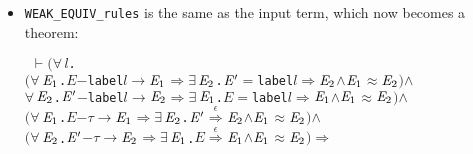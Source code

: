 \documentclass[GCNS]{yincog}
\renewcommand{\HOLConst}[1]{\texttt{#1}}
\renewcommand{\HOLBoundVar}[1]{\ensuremath{\mathit{#1}}}
\renewcommand{\HOLFreeVar}[1]{\ensuremath{\mathit{#1}}}
\renewcommand{\HOLSymConst}[1]{#1}
\renewcommand{\HOLTokenConj}{\ensuremath{\wedge}}
\renewcommand{\HOLTokenExists}{\ensuremath{\exists \,}}
\renewcommand{\HOLTokenForall}{\ensuremath{\forall \,}}
\renewcommand{\HOLTokenTurnstile}{\ensuremath{\:\:\vdash}}
\theoremstyle{remark}
\theoremstyle{theorem}
\theoremstyle{remark}
\newcommand{\HOLTokenWeakEQ}{$\approx$}
\newcommand{\HOLTokenEPS}{$\overset{\epsilon}{\Longrightarrow}$}
\newcommand{\HOLTokenTransBegin}{$-$}
\newcommand{\HOLTokenTransEnd}{$\rightarrow$\xspace}
\newcommand{\HOLTokenWeakTransBegin}{$=$}
\newcommand{\HOLTokenWeakTransEnd}{$\Rightarrow$\xspace}
\renewcommand{\HOLTokenImp}{\ensuremath{\Longrightarrow}}
\begin{document}
\begin{itemize}
%
\item \texttt{WEAK\_EQUIV\_rules} is the same as the input term, which now
becomes a theorem:
%
\begin{alltt}
\HOLTokenTurnstile{} \ensuremath{(}\HOLSymConst{\HOLTokenForall{}}\HOLBoundVar{l}.
        \ensuremath{(}\HOLSymConst{\HOLTokenForall{}}\ensuremath{\HOLBoundVar{E}\sb{\mathrm{1}}}. \HOLFreeVar{E} \HOLTokenTransBegin\HOLConst{label} \HOLBoundVar{l}\HOLTokenTransEnd \ensuremath{\HOLBoundVar{E}\sb{\mathrm{1}}} \HOLSymConst{\HOLTokenImp{}} \HOLSymConst{\HOLTokenExists{}}\ensuremath{\HOLBoundVar{E}\sb{\mathrm{2}}}. \ensuremath{\HOLFreeVar{E}\sp{\prime}} \HOLTokenWeakTransBegin\HOLConst{label} \HOLBoundVar{l}\HOLTokenWeakTransEnd \ensuremath{\HOLBoundVar{E}\sb{\mathrm{2}}} \HOLSymConst{\HOLTokenConj{}} \ensuremath{\HOLBoundVar{E}\sb{\mathrm{1}}} \HOLSymConst{\HOLTokenWeakEQ} \ensuremath{\HOLBoundVar{E}\sb{\mathrm{2}}}\ensuremath{)} \HOLSymConst{\HOLTokenConj{}}
        \HOLSymConst{\HOLTokenForall{}}\ensuremath{\HOLBoundVar{E}\sb{\mathrm{2}}}. \ensuremath{\HOLFreeVar{E}\sp{\prime}} \HOLTokenTransBegin\HOLConst{label} \HOLBoundVar{l}\HOLTokenTransEnd \ensuremath{\HOLBoundVar{E}\sb{\mathrm{2}}} \HOLSymConst{\HOLTokenImp{}} \HOLSymConst{\HOLTokenExists{}}\ensuremath{\HOLBoundVar{E}\sb{\mathrm{1}}}. \HOLFreeVar{E} \HOLTokenWeakTransBegin\HOLConst{label} \HOLBoundVar{l}\HOLTokenWeakTransEnd \ensuremath{\HOLBoundVar{E}\sb{\mathrm{1}}} \HOLSymConst{\HOLTokenConj{}} \ensuremath{\HOLBoundVar{E}\sb{\mathrm{1}}} \HOLSymConst{\HOLTokenWeakEQ} \ensuremath{\HOLBoundVar{E}\sb{\mathrm{2}}}\ensuremath{)} \HOLSymConst{\HOLTokenConj{}}
   \ensuremath{(}\HOLSymConst{\HOLTokenForall{}}\ensuremath{\HOLBoundVar{E}\sb{\mathrm{1}}}. \HOLFreeVar{E} \HOLTokenTransBegin\HOLSymConst{\ensuremath{\tau}}\HOLTokenTransEnd \ensuremath{\HOLBoundVar{E}\sb{\mathrm{1}}} \HOLSymConst{\HOLTokenImp{}} \HOLSymConst{\HOLTokenExists{}}\ensuremath{\HOLBoundVar{E}\sb{\mathrm{2}}}. \ensuremath{\HOLFreeVar{E}\sp{\prime}} \HOLSymConst{\HOLTokenEPS} \ensuremath{\HOLBoundVar{E}\sb{\mathrm{2}}} \HOLSymConst{\HOLTokenConj{}} \ensuremath{\HOLBoundVar{E}\sb{\mathrm{1}}} \HOLSymConst{\HOLTokenWeakEQ} \ensuremath{\HOLBoundVar{E}\sb{\mathrm{2}}}\ensuremath{)} \HOLSymConst{\HOLTokenConj{}}
   \ensuremath{(}\HOLSymConst{\HOLTokenForall{}}\ensuremath{\HOLBoundVar{E}\sb{\mathrm{2}}}. \ensuremath{\HOLFreeVar{E}\sp{\prime}} \HOLTokenTransBegin\HOLSymConst{\ensuremath{\tau}}\HOLTokenTransEnd \ensuremath{\HOLBoundVar{E}\sb{\mathrm{2}}} \HOLSymConst{\HOLTokenImp{}} \HOLSymConst{\HOLTokenExists{}}\ensuremath{\HOLBoundVar{E}\sb{\mathrm{1}}}. \HOLFreeVar{E} \HOLSymConst{\HOLTokenEPS} \ensuremath{\HOLBoundVar{E}\sb{\mathrm{1}}} \HOLSymConst{\HOLTokenConj{}} \ensuremath{\HOLBoundVar{E}\sb{\mathrm{1}}} \HOLSymConst{\HOLTokenWeakEQ} \ensuremath{\HOLBoundVar{E}\sb{\mathrm{2}}}\ensuremath{)} \HOLSymConst{\HOLTokenImp{}}

\end{alltt}
\end{itemize}
\end{document}
